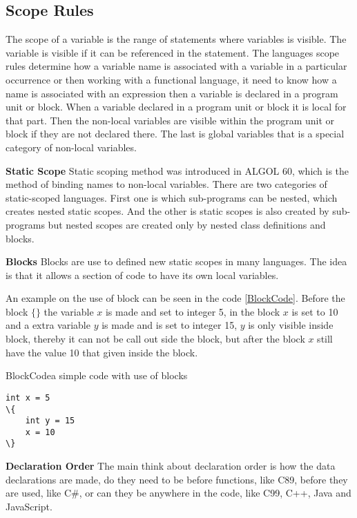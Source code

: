\subsection{Scope Rules}
The scope of a variable is the range of statements where variables is visible. The variable is visible if it can be referenced in the statement.
The languages scope rules determine how a variable name is associated with a variable in a particular occurrence or then working with a functional language, it need to know how a name is associated with an expression then a variable is declared in a program unit or block. When a variable declared in a program unit or block it is local for that part. Then the non-local variables are visible within the program unit or block if they are not declared there. The last is global variables that is a special category of non-local variables.

\textbf{Static Scope}
Static scoping method was introduced in ALGOL 60, which is the method of binding names to non-local variables. There are two categories of static-scoped languages. First one is which sub-programs can be nested, which creates nested static scopes. And the other is static scopes is also created by sub-programs but nested scopes are created only by nested class definitions and blocks.

\textbf{Blocks}
Blocks are use to defined new static scopes in many languages. The idea is that it allows a section of code to have its own local variables.

An example on the use of block can be seen in the code \ref{BlockCode}. Before the block $\{ \}$ the variable $x$ is made and set to integer 5, in the block $x$ is set to 10 and a extra variable $y$ is made and is set to integer 15, $y$ is only visible inside block, thereby it can not be call out side the block, but after the block $x$ still have the value 10 that given inside the block.

\begin{code}{BlockCode}{a simple code with use of blocks}
\begin{lstlisting}
int x = 5
\{
    int y = 15
    x = 10
\} 
\end{lstlisting}
\end{code}

\textbf{Declaration Order}
The main think about declaration order is how the data declarations are made, do they need to be before functions, like C89, before they are used, like C#, or can they be anywhere in the code, like C99, C++, Java and JavaScript.

